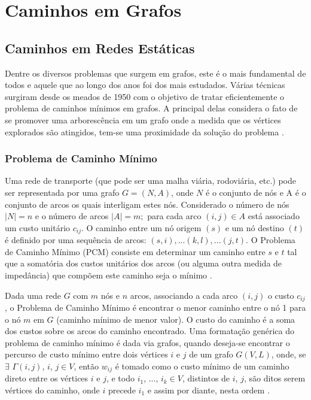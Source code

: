 \chapter{Caminhos em Grafos}

\section{Caminhos em Redes Estáticas}
Dentre os diversos problemas que surgem em grafos, este é o mais fundamental de todos e
aquele que ao longo dos anos foi dos mais estudados. Várias técnicas surgiram desde os meados
de 1950 com o objetivo de tratar eficientemente o problema de caminhos mínimos em grafos. A
principal delas considera o fato de se promover uma arborescência em um grafo onde a medida
que os vértices explorados são atingidos, tem-se uma proximidade da solução do problema \cite{negreirosbook}.

\subsection{Problema de Caminho Mínimo}
Uma rede de transporte (que pode ser uma malha viária, rodoviária, etc.) pode ser
representada por uma grafo $G = (N, A)$, onde $N$ é o conjunto de nós e A é o conjunto de arcos
os quais interligam estes nós. Considerado o número de nós $|N| = n$ e o número de arcos $|A| = m;$ para
cada arco $(i, j) \in A$ está associado um custo unitário $c_{ij}$. O caminho entre um
nó origem $(s)$ e um nó destino $(t)$ é definido por uma sequência de
arcos: $(s,i),...(k,l),...(j,t)$. O Problema de Caminho Mínimo (PCM) consiste em determinar
um caminho entre $s$ e $t$ tal que a somatória dos custos unitários dos arcos (ou alguma
outra medida de impedância) que compõem este caminho seja o mínimo \cite{cunha}.

Dada uma rede $G$ com $m$ nós e $n$ arcos, associando a cada arco $(i,j)$ o custo $c_{ij}$, o Problema
de Caminho Mínimo é encontrar o menor caminho entre o nó 1 para o nó $m$ em $G$ (caminho mínimo de menor valor).
O custo do caminho é a soma dos custos sobre os arcos do caminho encontrado. Uma formatação genérica do problema
de caminho mínimo é dada via grafos, quando deseja-se encontrar o percurso de custo mínimo entre dois vértices $i$ e $j$
de um grafo $G(V,L)$, onde, se $\exists$ $\Gamma (i,j)$, $i$, $j \in V$, então $w_{ij}$ é tomado como o custo mínimo
de um caminho direto entre os vértices $i$ e $j$, e todo $i_1$, ..., $i_k \in V$, distintos de $i$, $j$, são ditos
serem vértices do caminho, onde $i$ precede $i_1$ e assim por diante, nesta ordem \cite{negreirosbook}.

